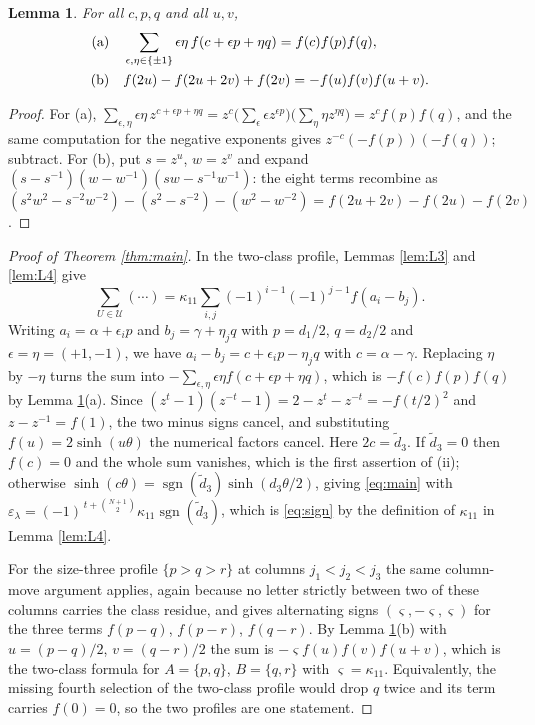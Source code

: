 \documentclass[11pt,reqno]{amsart}
\theoremstyle{plain}
\newtheorem{lemma}[theorem]{Lemma}
\theoremstyle{definition}
\newcommand{\sgn}{\operatorname{sgn}}
\begin{document}
\begin{lemma}\label{lem:L5}
For all $c,p,q$ and all $u,v$,
\begin{align*}
\text{\rm(a)}&\quad \sum_{\epsilon,\eta\in\{\pm1\}}\epsilon\eta\,f(c+\epsilon p+\eta q)=f(c)f(p)f(q),\\
\text{\rm(b)}&\quad f(2u)-f(2u+2v)+f(2v)=-f(u)f(v)f(u+v).
\end{align*}
\end{lemma}

\begin{proof}
For (a), $\sum_{\epsilon,\eta}\epsilon\eta\,z^{c+\epsilon p+\eta q}
=z^{c}\bigl(\sum_\epsilon\epsilon z^{\epsilon p}\bigr)\bigl(\sum_\eta\eta z^{\eta q}\bigr)
=z^{c}f(p)f(q)$, and the same computation for the negative exponents gives
$z^{-c}(-f(p))(-f(q))$; subtract. For (b), put $s=z^u$, $w=z^v$ and expand
$(s-s^{-1})(w-w^{-1})(sw-s^{-1}w^{-1})$: the eight terms recombine as
$(s^2w^2-s^{-2}w^{-2})-(s^2-s^{-2})-(w^2-w^{-2})=f(2u+2v)-f(2u)-f(2v)$.
\end{proof}

\begin{proof}[Proof of Theorem \ref{thm:main}]
In the two-class profile, Lemmas \ref{lem:L3} and \ref{lem:L4} give
\[
\sum_{U\in\mathcal U}(\cdots)=\kappa_{11}\sum_{i,j}(-1)^{i-1}(-1)^{j-1}f(a_i-b_j).
\]
Writing $a_i=\alpha+\epsilon_ip$ and $b_j=\gamma+\eta_jq$ with $p=d_1/2$, $q=d_2/2$ and
$\epsilon=\eta=(+1,-1)$, we have $a_i-b_j=c+\epsilon_ip-\eta_jq$ with $c=\alpha-\gamma$. Replacing
$\eta$ by $-\eta$ turns the sum into $-\sum_{\epsilon,\eta}\epsilon\eta f(c+\epsilon p+\eta q)$,
which is $-f(c)f(p)f(q)$ by Lemma \ref{lem:L5}(a). Since
$(z^t-1)(z^{-t}-1)=2-z^t-z^{-t}=-f(t/2)^2$ and $z-z^{-1}=f(1)$, the two minus signs cancel, and
substituting $f(u)=2\sinh(u\theta)$ the numerical factors cancel. Here $2c=\tilde d_3$. If
$\tilde d_3=0$ then $f(c)=0$ and the whole sum vanishes, which is the first assertion of {\rm(ii)};
otherwise $\sinh(c\theta)=\sgn(\tilde d_3)\sinh(d_3\theta/2)$, giving \eqref{eq:main} with
$\varepsilon_\lambda=(-1)^{\,t+\binom{N+1}{2}}\kappa_{11}\sgn(\tilde d_3)$, which is
\eqref{eq:sign} by the definition of $\kappa_{11}$ in Lemma \ref{lem:L4}.

For the size-three profile $\{p>q>r\}$ at columns $j_1<j_2<j_3$ the same column-move argument
applies, again because no letter strictly between two of these columns carries the class residue,
and gives alternating signs $(\varsigma,-\varsigma,\varsigma)$ for the three terms $f(p-q)$,
$f(p-r)$, $f(q-r)$. By Lemma \ref{lem:L5}(b) with $u=(p-q)/2$, $v=(q-r)/2$ the sum is
$-\varsigma f(u)f(v)f(u+v)$, which is the two-class formula for $A=\{p,q\}$, $B=\{q,r\}$ with
$\varsigma=\kappa_{11}$. Equivalently, the missing fourth selection of the two-class profile would
drop $q$ twice and its term carries $f(0)=0$, so the two profiles are one statement.
\end{proof}
\end{document}
